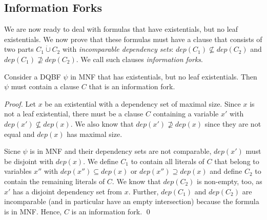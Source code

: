 \documentclass{svjour3}
\newcommand{\dep}{\mathit{dep}}
\begin{document}



\subsection{Information Forks}
\label{ssect:informationforks}

We are now ready to deal with formulas that have existentials, but no leaf existentials.
We now prove that these formulas must have a clause that consists of two parts $C_1\dot\cup C_2$ with \emph{incomparable dependency sets}: $\dep(C_1)\not\subseteq\dep(C_2)$ and $\dep(C_1)\not\supseteq\dep(C_2)$.
We call such clauses \emph{information forks}.

\begin{lemma}
\label{lem:informationforks}
Consider a DQBF $\psi$ in MNF that has existentials, but no leaf existentials.
Then $\psi$ must contain a clause $C$ that is an information fork.
\end{lemma}

\begin{proof}
Let $x$ be an existential with a dependency set of maximal size.
Since $x$ is not a leaf existential, there must be a clause $C$ containing a variable $x'$ with $\dep(x')\not\subseteq\dep(x)$.
We also know that $\dep(x')\not\supseteq\dep(x)$ since they are not equal and $\dep(x)$ has maximal size.

Sicne $\psi$ is in MNF and their dependency sets are not comparable, $\dep(x')$ must be disjoint with $\dep(x)$.
We define $C_1$ to contain all literals of $C$ that belong to variables $x''$ with $\dep(x'')\subseteq\dep(x)$ or $\dep(x'')\supseteq\dep(x)$ and define $C_2$ to contain the remaining literals of $C$.
We know that $\dep(C_2)$ is non-empty, too, as $x'$ has a disjoint dependency set from $x$.
Further, $\dep(C_1)$ and $\dep(C_2)$ are incomparable (and in particular have an empty intersection) because the formula is in MNF.
Hence, $C$ is an information fork.
\qed
\end{proof}
\end{document}
